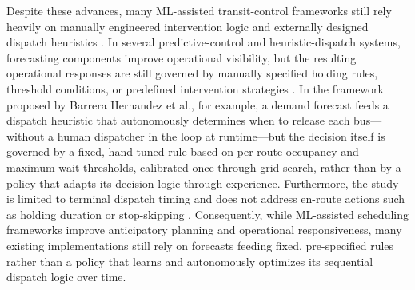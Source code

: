 Despite these advances, many ML-assisted transit-control frameworks still rely heavily on manually engineered intervention logic and externally designed dispatch heuristics \cite{alexandre2023}. In several predictive-control and heuristic-dispatch systems, forecasting components improve operational visibility, but the resulting operational responses are still governed by manually specified holding rules, threshold conditions, or predefined intervention strategies \cite{pang2019,Barrera2025Optimization}. In the framework proposed by Barrera Hernandez et al., for example, a demand forecast feeds a dispatch heuristic that autonomously determines when to release each bus---without a human dispatcher in the loop at runtime---but the decision itself is governed by a fixed, hand-tuned rule based on per-route occupancy and maximum-wait thresholds, calibrated once through grid search, rather than by a policy that adapts its decision logic through experience. Furthermore, the study is limited to terminal dispatch timing and does not address en-route actions such as holding duration or stop-skipping \cite{Barrera2025Optimization}. Consequently, while ML-assisted scheduling frameworks improve anticipatory planning and operational responsiveness, many existing implementations still rely on forecasts feeding fixed, pre-specified rules rather than a policy that learns and autonomously optimizes its sequential dispatch logic over time.


